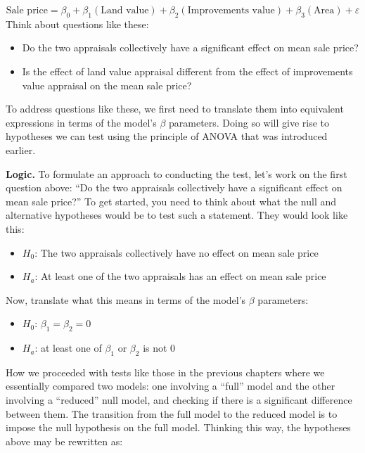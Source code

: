 \documentclass[
]{book}
\providecommand{\tightlist}{%
  \setlength{\itemsep}{0pt}\setlength{\parskip}{0pt}}
\begin{document}
\[\textrm{Sale price} = \beta_0 + \beta_1(\textrm{Land value}) + \beta_2(\textrm{Improvements value}) + \beta_3(\textrm{Area}) + \varepsilon\]
Think about questions like these:

\begin{itemize}
\tightlist
\item
  Do the two appraisals collectively have a significant effect on mean sale price?
\item
  Is the effect of land value appraisal different from the effect of improvements value appraisal on the mean sale price?
\end{itemize}

To address questions like these, we first need to translate them into equivalent expressions in terms of the model's \(\beta\) parameters. Doing so will give rise to hypotheses we can test using the principle of ANOVA that was introduced earlier.

\textbf{Logic.} To formulate an approach to conducting the test, let's work on the first question above: ``Do the two appraisals collectively have a significant effect on mean sale price?'' To get started, you need to think about what the null and alternative hypotheses would be to test such a statement. They would look like this:

\begin{itemize}
\tightlist
\item
  \(H_0\): The two appraisals collectively have no effect on mean sale price
\item
  \(H_a\): At least one of the two appraisals has an effect on mean sale price
\end{itemize}

Now, translate what this means in terms of the model's \(\beta\) parameters:

\begin{itemize}
\tightlist
\item
  \(H_0\): \(\beta_1 = \beta_2 = 0\)
\item
  \(H_a\): at least one of \(\beta_1\) or \(\beta_2\) is not 0
\end{itemize}

How we proceeded with tests like those in the previous chapters where we essentially compared two models: one involving a ``full'' model and the other involving a ``reduced'' null model, and checking if there is a significant difference between them. The transition from the full model to the reduced model is to impose the null hypothesis on the full model. Thinking this way, the hypotheses above may be rewritten as:
\end{document}
